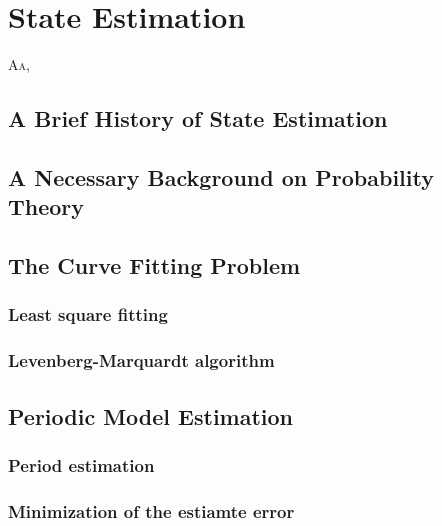 
\chapter{State Estimation}
\label{cp:est}


\lettrine{A}{a}, 


\section{A Brief History of State Estimation}


\section{A Necessary Background on Probability Theory}


\section{The Curve Fitting Problem}

\subsection{Least square fitting}

\subsection{Levenberg-Marquardt algorithm}


\section{Periodic Model Estimation}

\subsection{Period estimation}

\subsection{Minimization of the estiamte error}

